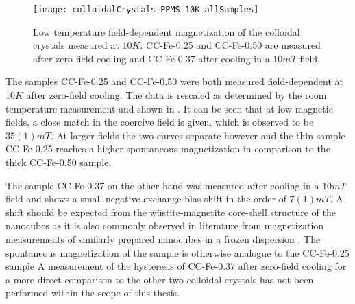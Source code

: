 \documentclass[\main/dresen_thesis.tex]{subfiles}
\begin{document}
    \begin{figure}[tb]
      \centering
      \texttt{[image: colloidalCrystals\_PPMS\_10K\_allSamples]}
      \caption{\label{fig:colloidalCrystals:10KVSM}Low temperature field-dependent magnetization of the colloidal crystals measured at $10 \unit{K}$. CC-Fe-0.25 and CC-Fe-0.50 are measured after zero-field cooling and CC-Fe-0.37 after cooling in a $10 \unit{mT}$ field.}
    \end{figure}
    The samples CC-Fe-0.25 and CC-Fe-0.50 were both measured field-dependent at $10 \unit{K}$ after zero-field cooling. The data is rescaled as determined by the room temperature measurement and shown in .
    It can be seen that at low magnetic fields, a close match in the coercive field is given, which is observed to be $35(1) \unit{mT}$.
    At larger fields the two curves separate however and the thin sample CC-Fe-0.25 reaches a higher spontaneous magnetization in comparison to the thick CC-Fe-0.50 sample.

    The sample CC-Fe-0.37 on the other hand was measured after cooling in a $10 \unit{mT}$ field and shows a small negative exchange-bias shift in the order of $7(1) \unit{mT}$.
    A shift should be expected from the w\"ustite-magnetite core-shell structure of the nanocubes as it is also commonly observed in literature from magnetization measurements of similarly prepared nanocubes in a frozen dispersion \cite{Wetterskog_2013_Anoma}.
    The spontaneous magnetization of the sample is otherwise analogue to the CC-Fe-0.25 sample
    A measurement of the hysteresis of CC-Fe-0.37 after zero-field cooling for a more direct comparison to the other two colloidal crystals has not been performed within the scope of this thesis.
\end{document}
